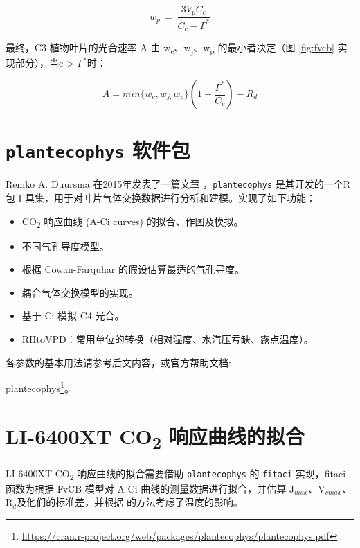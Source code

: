 \documentclass[]{krantz}
\providecommand{\tightlist}{%
  \setlength{\itemsep}{0pt}\setlength{\parskip}{0pt}}
\renewcommand{\href}[2]{#2\footnote{\url{#1}}}
\theoremstyle{definition}
\theoremstyle{definition}
\theoremstyle{definition}
\theoremstyle{remark}
\begin{document}
\begin{equation}
w_{p\ }=\ \frac{3V_{p}C_{c}}{C_{c}-\Gamma^{*}}
\end{equation}

最终，C3 植物叶片的光合速率 A 由
w\textsubscript{c}、w\textsubscript{j}、w\textsubscript{p}
的最小者决定（图 \ref{fig:fvcb} 实现部分），当c \textgreater{}
\(\Gamma^{*}\)时：

\begin{equation}
A=min\{w_{c},w_{j,}w_{p}\}(1-\frac{\Gamma^{*}}{C_{c}})-R_{d}
\end{equation}

\section{\texorpdfstring{\texttt{plantecophys}
软件包}{plantecophys 软件包}}\label{plantecophys}

Remko A. Duursma 在2015年发表了一篇文章
\citet{Duursma2015Plantecophys}，\texttt{plantecophys}
是其开发的一个R包工具集，用于对叶片气体交换数据进行分析和建模。实现了如下功能：

\begin{itemize}
\tightlist
\item
  CO\textsubscript{2} 响应曲线 (A-Ci curves) 的拟合、作图及模拟。
\item
  不同气孔导度模型。
\item
  根据 Cowan-Farquhar 的假设估算最适的气孔导度。
\item
  耦合气体交换模型的实现。
\item
  基于 Ci 模拟 C4 光合。
\item
  RHtoVPD：常用单位的转换（相对湿度、水汽压亏缺、露点温度）。
\end{itemize}

各参数的基本用法请参考后文内容，或官方帮助文档:

\href{https://cran.r-project.org/web/packages/plantecophys/plantecophys.pdf}{plantecophys}。

\section{\texorpdfstring{LI-6400XT CO\textsubscript{2}
响应曲线的拟合}{LI-6400XT CO2 响应曲线的拟合}}\label{fit6400}

LI-6400XT CO\textsubscript{2} 响应曲线的拟合需要借助
\texttt{plantecophys} 的 \texttt{fitaci} 实现，fitaci 函数为根据 FvCB
模型对 A-Ci 曲线的测量数据进行拟合，并估算
J\(_{max}\)、V\(_{cmax}\)、R\(_{d}\)及他们的标准差，并根据
\citet{Medlyn2002Temperature} 的方法考虑了温度的影响。
\end{document}
